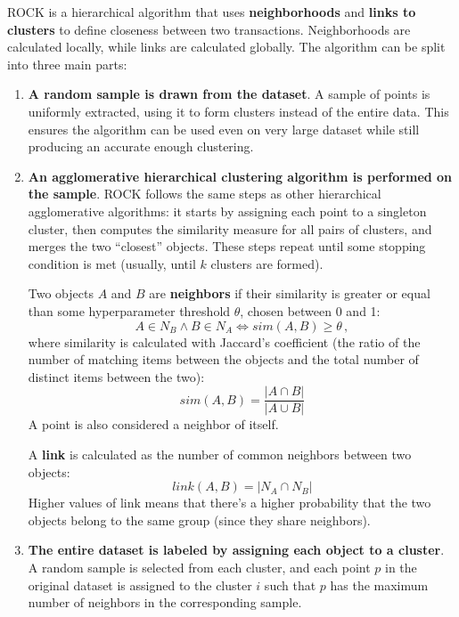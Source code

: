 ROCK is a hierarchical algorithm that uses \textbf{neighborhoods} and \textbf{links to clusters} to define closeness between two transactions. Neighborhoods are calculated locally, while links are calculated globally. The algorithm can be split into three main parts:
\begin{enumerate}
    \item \textbf{A random sample is drawn from the dataset}. A sample of points is uniformly extracted, using it to form clusters instead of the entire data. This ensures the algorithm can be used even on very large dataset while still producing an accurate enough clustering.

    \item \textbf{An agglomerative hierarchical clustering algorithm is performed on the sample}. ROCK follows the same steps as other hierarchical agglomerative algorithms: it starts by assigning each point to a singleton cluster, then computes the similarity measure for all pairs of clusters, and merges the two ``closest'' objects. These steps repeat until some stopping condition is met (usually, until $k$ clusters are formed).

    Two objects $A$ and $B$ are \textbf{neighbors} if their similarity is greater or equal than some hyperparameter threshold $\theta$, chosen between 0 and 1:
    \begin{equation*}
        A \in N_B \land B \in N_A \iff sim(A,B) \geq \theta \,,
    \end{equation*}
    where similarity is calculated with Jaccard's coefficient (the ratio of the number of matching items between the objects and the total number of distinct items between the two):
    \begin{equation*}
        sim(A,B) = \dfrac{|A \cap B|}{|A \cup B|}
    \end{equation*}
    A point is also considered a neighbor of itself.

    A \textbf{link} is calculated as the number of common neighbors between two objects:
    \begin{equation*}
        link(A,B) = |N_A \cap N_B|
    \end{equation*}
    Higher values of link means that there's a higher probability that the two objects belong to the same group (since they share neighbors). 
    
    \item \textbf{The entire dataset is labeled by assigning each object to a cluster}. A random sample is selected from each cluster, and each point $p$ in the original dataset is assigned to the cluster $i$ such that $p$ has the maximum number of neighbors in the corresponding sample.
\end{enumerate}
